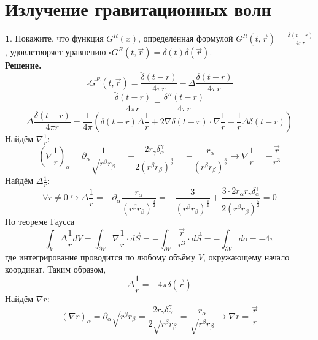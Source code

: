 \documentclass[12pt]{article}
\theoremstyle{definition}
\newtheorem{zad}{}[section]
\begin{document}
\section{Излучение гравитационных волн}
\begin{zad}
Покажите, что функция $G^R(x)$, определённая формулой $G^R(t,\vec{r})=\frac{\delta(t-r)}{4\pi r}$, удовлетворяет уравнению $\square G^R(t,\vec{r})=\delta(t)\delta(\vec{r})$.\\
\textbf{Решение.}\\
\begin{equation}
    \square G^R(t,\vec{r})=\frac{\ddot{\delta}(t-r)}{4\pi r}-\Delta\frac{\delta(t-r)}{4\pi r}
\end{equation}
\begin{equation}
    \frac{\ddot{\delta}(t-r)}{4\pi r}=\frac{\delta''(t-r)}{4\pi r}
\end{equation}
\begin{equation}
    \Delta\frac{\delta(t-r)}{4\pi r}=\frac{1}{4\pi}\left(\delta(t-r)\Delta\frac{1}{r}+2\nabla\delta(t-r)\cdot\nabla\frac{1}{r}+\frac{1}{r}\Delta\delta(t-r)\right)
\end{equation}
Найдём $\nabla\frac{1}{r}$:
\begin{equation}
    \left(\nabla\frac{1}{r}\right)_\alpha=\partial_\alpha\frac{1}{\sqrt{r^\beta r_\beta}}=-\frac{2r_\gamma\delta_\alpha^\gamma}{2(r^\beta r_\beta)^\frac{3}{2}}=-\frac{r_\alpha}{(r^\beta r_\beta)^\frac{3}{2}}\rightarrow \nabla\frac{1}{r}=-\frac{\vec{r}}{r^3}
\end{equation}
Найдём $\Delta\frac{1}{r}$:
\begin{equation}
    \forall r\neq0\hookrightarrow\Delta\frac{1}{r}=-\partial_\alpha\frac{r_\alpha}{(r^\beta r_\beta)^\frac{3}{2}}=-\frac{3}{(r^\beta r_\beta)^\frac{3}{2}}+\frac{3\cdot 2r_\alpha r_\gamma\delta^\gamma_\alpha}{2(r^\beta r_\beta)^\frac{5}{2}}=0
\end{equation}
По теореме Гаусса
\begin{equation}
    \int_V\Delta\frac{1}{r}dV=\int_{\partial V}\nabla\frac{1}{r}\cdot d\vec{S}=-\int_{\partial V}\frac{\vec{r}}{r^3}\cdot d\vec{S}=-\int_{\partial V}do=-4\pi
\end{equation}
где интегрирование проводится по любому объёму $V$, окружающему начало координат. Таким образом,
\begin{equation}
    \Delta\frac{1}{r}=-4\pi\delta(\vec{r})
\end{equation}
Найдём $\nabla r$:
\begin{equation}
    (\nabla r)_\alpha=\partial_\alpha\sqrt{r^\beta r_\beta}=\frac{2r_\gamma\delta^\gamma_\alpha}{2\sqrt{r^\beta r_\beta}}=\frac{r_\alpha}{\sqrt{r^\beta r_\beta}}\rightarrow \nabla r=\frac{\vec{r}}{r}

\end{equation}
\end{zad}
\end{document}
